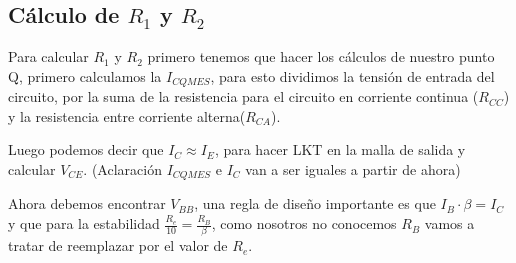 \begin{multicols}{2}
		\subsection{Cálculo de $R_1$ y $R_2$}
			\sangria{}Para calcular $R_1$ y $R_2$ primero tenemos que hacer los cálculos de nuestro punto Q, primero calculamos la $I_{CQMES}$, para esto dividimos la tensión de entrada del circuito, por la suma de la resistencia para el circuito en corriente continua ($R_{CC}$) y la resistencia entre corriente alterna($R_{CA}$).
            \vspace{-5pt}

\columnbreak{}
			\sangria{}Luego podemos decir que $I_C \approx I_E$, para hacer LKT en la malla de salida y calcular $V_{CE}$. (Aclaración $I_{CQMES}$ e $I_C$ van a ser iguales a partir de ahora)

			\sangria{}Ahora debemos encontrar $V_{BB}$, una regla de diseño importante es que $I_B \cdot \beta = I_C$ y que para la estabilidad $\frac{R_e}{10}=\frac{R_B}{\beta}$, como nosotros no conocemos $R_B$ vamos a tratar de reemplazar por el valor de $R_e$.


\end{multicols}
